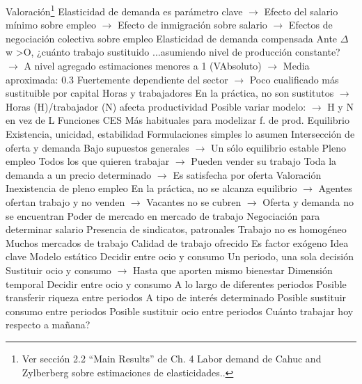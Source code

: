 \documentclass{nuevotema}
\begin{document}
\begin{esquemal}
			\3 Valoración\footnote{Ver sección 2.2 ``Main Results'' de Ch. 4 Labor demand de Cahuc and Zylberberg sobre estimaciones de elasticidades..}
				\4 Elasticidad de demanda es parámetro clave
				\4[] $\to$ Efecto del salario mínimo sobre empleo
				\4[] $\to$ Efecto de inmigración sobre salario
				\4[] $\to$ Efectos de negociación colectiva sobre empleo
				\4 Elasticidad de demanda compensada
				\4[] Ante $\Delta$ w >O, ¿cuánto trabajo sustituido
				\4[] ...asumiendo nivel de producción constante?
				\4[] $\to$ A nivel agregado
				\4[] estimaciones menores a 1 (VAbsoluto)
				\4[] $\to$ Media aproximada: 0.3
				\4[] Fuertemente dependiente del sector
				\4[] $\to$ Poco cualificado más sustituible por capital
				\4 Horas y trabajadores
				\4[] En la práctica, no son sustitutos
				\4[] $\to$ Horas (H)/trabajador (N) afecta productividad
				\4[] Posible variar modelo:
				\4[] $\to$ H y N en vez de L
				\4 Funciones CES
				\4[] Más habituales para modelizar f. de prod.
		\2 Equilibrio
			\3 Existencia, unicidad, estabilidad
				\4 Formulaciones simples lo asumen
				\4 Intersección de oferta y demanda
				\4[] Bajo supuestos generales
				\4[] $\to$ Un sólo equilibrio estable
			\3 Pleno empleo
				\4 Todos los que quieren trabajar
				\4[] $\to$ Pueden vender su trabajo
				\4 Toda la demanda a un precio determinado
				\4[] $\to$ Es satisfecha por oferta
		\2 Valoración
			\3 Inexistencia de pleno empleo
				\4 En la práctica, no se alcanza equilibrio
				\4[] $\to$ Agentes ofertan trabajo y no venden
				\4[] $\to$ Vacantes no se cubren
				\4[] $\to$ Oferta y demanda no se encuentran
			\3 Poder de mercado en mercado de trabajo
				\4 Negociación para determinar salario
				\4 Presencia de sindicatos, patronales
			\3 Trabajo no es homogéneo
				\4 Muchos mercados de trabajo
				\4 Calidad de trabajo ofrecido
				\4[] Es factor exógeno
	\1 
		\2 Idea clave
			\3 Modelo estático
				\4 Decidir entre ocio y consumo
				\4[] Un periodo, una sola decisión
				\4 Sustituir ocio y consumo
				\4[] $\to$ Hasta que aporten mismo bienestar
			\3 Dimensión temporal
				\4 Decidir entre ocio y consumo
				\4[] A lo largo de diferentes periodos
				\4 Posible transferir riqueza entre periodos
				\4[] A tipo de interés determinado
				\4 Posible sustituir consumo entre periodos
				\4 Posible sustituir ocio entre periodos
				\4[$\then$] Cuánto trabajar hoy respecto a mañana?

\end{esquemal}
\end{document}
